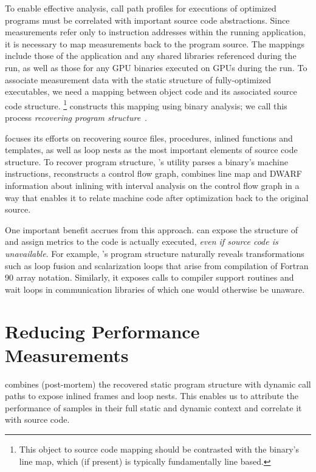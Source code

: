 \documentclass[11pt,twoside,letterpaper]{report}
\begin{document}
To enable effective analysis, call path profiles for executions of optimized programs must be correlated
with important source code abstractions.
Since measurements refer only to instruction addresses within the running application,
it is necessary to map measurements back to the program source.
The mappings include those of the application and any shared libraries referenced during the
run, as well as those for any GPU binaries executed on GPUs during the run.
To associate measurement data with the static structure of fully-optimized executables,
we need a mapping between object code and its associated source code structure.
\footnote{This object to source code mapping should be contrasted with the binary's line map, which
(if present) is typically fundamentally line based.}
\HPCToolkit{} constructs this mapping using binary analysis; we call this process
\emph{recovering program structure}~\cite{Tallent-MC-Fagan:2009:PLDI-hpctoolkit-binary-analysis}.

\HPCToolkit{} focuses its efforts on recovering source files, procedures, inlined functions and templates, as well as
loop nests as the most important elements of source code structure.
To recover program structure, \HPCToolkit's \hpcstruct{} utility parses a binary's machine instructions,
reconstructs a control flow graph, combines line map and DWARF information about inlining with interval
analysis on the control flow graph in a way that enables it to relate machine code after optimization
back to the original source.

One important benefit accrues from this approach.
\HPCToolkit{} can expose the structure of and assign metrics to the code is actually executed, \emph{even if source code is unavailable}.
For example, \hpcstruct{}'s program structure naturally reveals transformations such as loop fusion and scalarization
loops that arise from compilation of Fortran 90 array notation.
Similarly, it exposes calls to compiler support routines and wait loops in communication libraries of which one would otherwise be unaware.


\section{Reducing Performance Measurements}
\HPCToolkit{} combines (post-mortem) the recovered static program structure with dynamic call paths to expose inlined frames and loop nests.
This enables us to attribute the performance of samples in their full static and dynamic context and correlate it with source code.
\end{document}
